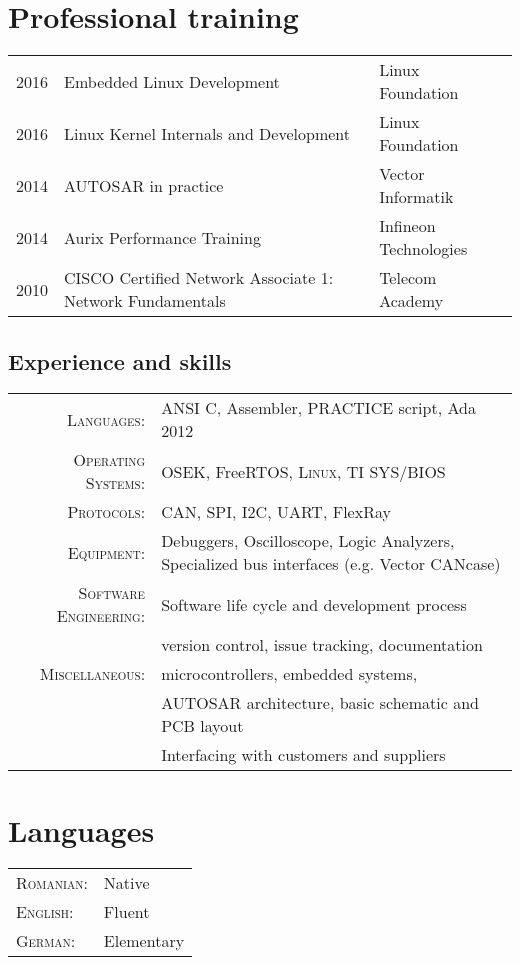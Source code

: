 \documentclass[a4paper,10pt]{article}
\begin{document}
\section{Professional training}
\begin{tabular}{lll}
 \textsc{2016} & Embedded Linux Development & \footnotesize Linux Foundation\normalsize\\
 \textsc{2016} & Linux Kernel Internals and Development & \footnotesize Linux Foundation \normalsize  \\
 \textsc{2014} & AUTOSAR in practice & \footnotesize Vector Informatik \normalsize  \\
 \textsc{2014} & Aurix Performance Training & \footnotesize Infineon Technologies \normalsize\\
 \textsc{2010} & CISCO Certified Network Associate 1: Network Fundamentals & \footnotesize Telecom Academy \normalsize
\end{tabular}


\begin{spacing}{1.2}
\section{Experience and skills}
\begin{tabular}{rl}
\textsc{Languages:} & ANSI C, Assembler, PRACTICE script, Ada 2012 \\
\textsc{Operating Systems:} & OSEK, FreeRTOS, \textsc{Linux}, TI SYS/BIOS \\
\textsc{Protocols:} & CAN, SPI, I2C, UART, FlexRay \\
\textsc{Equipment:} & Debuggers, Oscilloscope, Logic Analyzers, Specialized bus interfaces (e.g. Vector CANcase)\\
\textsc{Software Engineering:} & Software life cycle and development process\\
& version control, issue tracking, documentation\\
\textsc{Miscellaneous:} & microcontrollers, embedded systems, \\
& AUTOSAR architecture, basic schematic and PCB layout \\
& Interfacing with customers and suppliers\\
\end{tabular}
\end{spacing}

\section{Languages}
\begin{tabular}{ll}
 \textsc{Romanian:}& Native\\
\textsc{English:}& Fluent\\
\textsc{German:}& Elementary\\
\end{tabular}
\end{document}

